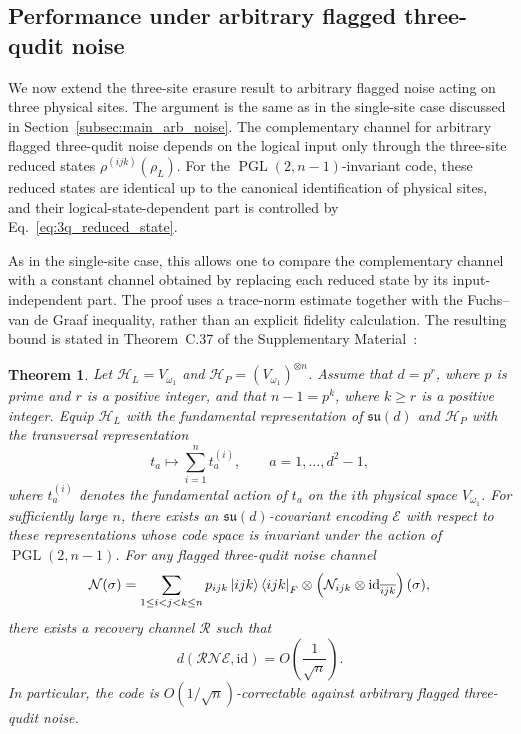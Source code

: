\documentclass[10pt,twocolumn,superscriptaddress,aps,amsmath,amssymb,citeautoscript,floatfix,prx]{revtex4-2}
\newtheorem{theorem}{Theorem}
\theoremstyle{plain}
\theoremstyle{plain}
\theoremstyle{plain}
\theoremstyle{plain}
\theoremstyle{plain}
\theoremstyle{plain}
\begin{document}
\subsection{Performance under arbitrary flagged three-qudit noise}\label{subsec:main_arb_3_noise}

We now extend the three-site erasure result to arbitrary flagged noise acting on three physical sites. The argument is the same as in the single-site case discussed in Section~\ref{subsec:main_arb_noise}. The complementary channel for arbitrary flagged three-qudit noise depends on the logical input only through the three-site reduced states $\rho^{(ijk)}(\rho_L)$. For the $\operatorname{PGL}(2,n-1)$-invariant code, these reduced states are identical up to the canonical identification of physical sites, and their logical-state-dependent part is controlled by Eq.~\eqref{eq:3q_reduced_state}.

As in the single-site case, this allows one to compare the complementary channel with a constant channel obtained by replacing each reduced state by its input-independent part. The proof uses a trace-norm estimate together with the Fuchs--van de Graaf inequality, rather than an explicit fidelity calculation. The resulting bound is stated in Theorem~C.37 of the Supplementary Material~\cite{SuppMat}:

\begin{theorem}
Let $\mathcal H_L=V_{\omega_1}$ and $\mathcal H_P=(V_{\omega_1})^{\otimes n}$. Assume that $d=p^r$, where $p$ is prime and $r$ is a positive integer, and that $n-1=p^k$, where $k\ge r$ is a positive integer. Equip $\mathcal H_L$ with the fundamental representation of $\mathfrak{su}(d)$ and $\mathcal H_P$ with the transversal representation
$$
t_a
\longmapsto
\sum_{i=1}^n t_a^{(i)},
\qquad
a=1,\ldots,d^2-1,
$$
where $t_a^{(i)}$ denotes the fundamental action of $t_a$ on the $i$th physical space $V_{\omega_1}$. For sufficiently large $n$, there exists an $\mathfrak{su}(d)$-covariant encoding $\mathcal E$ with respect to these representations whose code space is invariant under the action of $\operatorname{PGL}(2,n-1)$. For any flagged three-qudit noise channel
$$
\mathcal N(\sigma)
=
\sum_{1\le i<j<k\le n}
p_{ijk}
\ket{ijk}\bra{ijk}_F
\otimes
\left(
\mathcal N_{ijk}\otimes\mathrm{id}_{\overline{ijk}}
\right)(\sigma),
$$
there exists a recovery channel $\mathcal R$ such that
$$
d(\mathcal R\mathcal N\mathcal E,\mathrm{id})
=
O\left(\frac{1}{\sqrt n}\right).
$$
In particular, the code is $O(1/\sqrt n)$-correctable against arbitrary flagged three-qudit noise.
\end{theorem}
\end{document}
